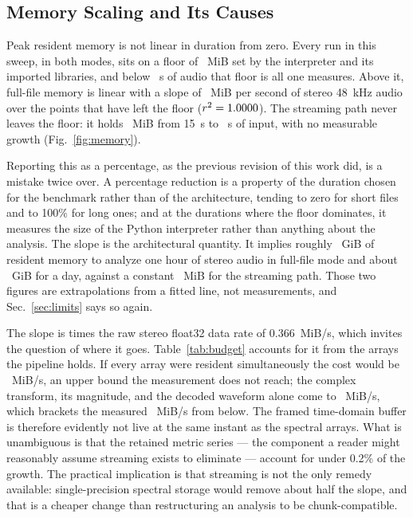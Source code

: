 \documentclass[final]{jaes}
\begin{document}
\subsection{Memory Scaling and Its Causes}
\label{sec:memory}

Peak resident memory is not linear in duration from zero. Every run in this sweep, in both modes, sits on a floor of \memFloor~MiB set by the interpreter and its imported libraries, and below \memFloorBelow~s of audio that floor is all one measures. Above it, full-file memory is linear with a slope of \memFullSlope~MiB per second of stereo 48~kHz audio over the \memFitPoints{} points that have left the floor ($r^2=1.0000$). The streaming path never leaves the floor: it holds \memStreamIntercept~MiB from 15~s to \memMaxDuration~s of input, with no measurable growth (Fig.~\ref{fig:memory}).

Reporting this as a percentage, as the previous revision of this work did, is a mistake twice over. A percentage reduction is a property of the duration chosen for the benchmark rather than of the architecture, tending to zero for short files and to 100\% for long ones; and at the durations where the floor dominates, it measures the size of the Python interpreter rather than anything about the analysis. The slope is the architectural quantity. It implies roughly \memFullHour~GiB of resident memory to analyze one hour of stereo audio in full-file mode and about \memFullDay~GiB for a day, against a constant \memStreamIntercept~MiB for the streaming path. Those two figures are extrapolations from a fitted line, not measurements, and Sec.~\ref{sec:limits} says so again.

The slope is \memDataRateMultiple{} times the raw stereo float32 data rate of 0.366~MiB/s, which invites the question of where it goes. Table~\ref{tab:budget} accounts for it from the arrays the pipeline holds. If every array were resident simultaneously the cost would be \memPredicted~MiB/s, an upper bound the measurement does not reach; the complex transform, its magnitude, and the decoded waveform alone come to \memPredictedSubset~MiB/s, which brackets the measured \memFullSlope~MiB/s from below. The framed time-domain buffer is therefore evidently not live at the same instant as the spectral arrays. What is unambiguous is that the retained metric series --- the component a reader might reasonably assume streaming exists to eliminate --- account for under 0.2\% of the growth. The practical implication is that streaming is not the only remedy available: single-precision spectral storage would remove about half the slope, and that is a cheaper change than restructuring an analysis to be chunk-compatible.
\end{document}
